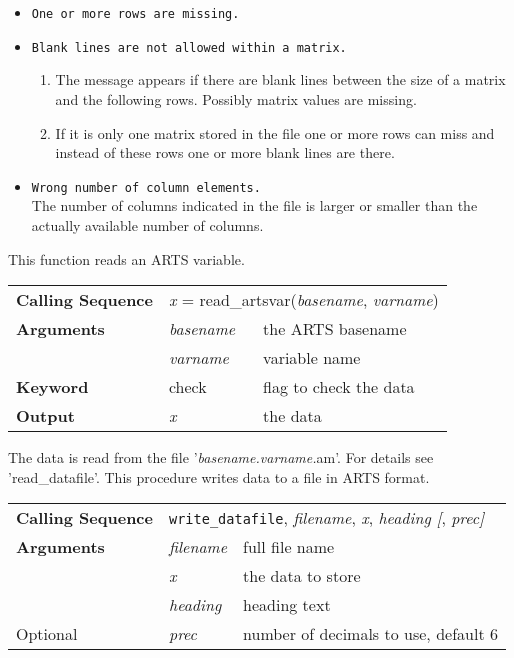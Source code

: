 \begin{itemize}
  \item \texttt{One or more rows are missing.}
  \item \texttt{Blank lines are not allowed within a matrix.}
        \begin{enumerate}
          \item The message appears if there are blank lines between
                the size of a matrix and the following rows. Possibly
                matrix values are missing.
          \item If it is only one matrix stored in the file one or
                more rows can miss and instead of these rows one or
                more blank lines are there.
        \end{enumerate}
  \item \texttt{Wrong number of column elements.} \\
        The number of columns indicated in the file is larger or
        smaller than the actually available number of columns.
\end{itemize}
This function reads an ARTS variable.
\begin{center}
\begin{tabular}{|l|ll|}
  \hline
  \textbf{Calling Sequence} &
  \multicolumn{2}{l|}{\textit{x} = %
  {\ttfamily read\_artsvar(\textnormal{\textit{basename}, %
                                       \textit{varname}})}}        \\
  \textbf{Arguments} & \textit{basename} & the ARTS basename       \\
                     & \textit{varname}  & variable name           \\
  \textbf{Keyword}   & check             & flag to check the data  \\
  \textbf{Output}    & \textit{x}        & the data                \\
  \hline
\end{tabular}
\end{center}
The data is read from the file '\textit{basename.varname.}am'. For
details see 'read\_datafile'.
 \label{writing}
This procedure writes data to a file in ARTS format.
\begin{center}
\begin{tabular}{|l|ll|}
  \hline
  \textbf{Calling Sequence} &
  \multicolumn{2}{l|}{\texttt{write\_datafile}, %
                      \textit{filename}, \textit{x}, %
                      \textit{heading [}, \textit{prec]}}    \\
  \textbf{Arguments} & \textit{filename} & full file name    \\
                     & \textit{x}        & the data to store \\
                     & \textit{heading}  & heading text      \\
  Optional           & \textit{prec}     &
                       number of decimals to use, default 6  \\
  \hline
\end{tabular}
\end{center}
